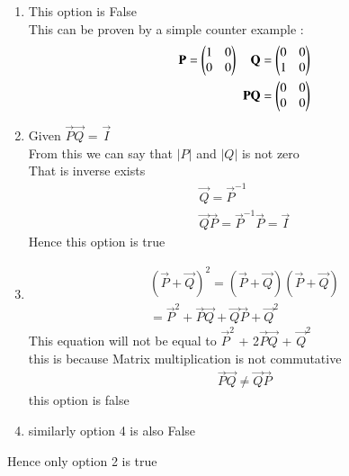 \documentclass[journal]{IEEEtran}
\begin{document}
\begin{enumerate}
    \item This option is False\\
    This can be proven by a simple counter example :\\
    \begin{align}
        \mathbf{P} = \begin{pmatrix}1&0\\0&0\end{pmatrix} \quad
        \mathbf{Q} = \begin{pmatrix}0&0\\1&0\end{pmatrix}\\
        \mathbf{P}\mathbf{Q} = \begin{pmatrix}0&0\\0&0\end{pmatrix}
    \end{align}

    \item Given $\vec{P}\vec{Q}$ = $\vec{I}$ \\
     From this we can say that $\lvert P \rvert$ and $\lvert Q \rvert$ is not zero \\
     That is inverse exists
     \begin{align}
         \vec{Q} = \vec{P}^{-1}\\
         \vec{Q}\vec{P} = \vec{P}^{-1}\vec{P} = \vec{I}
     \end{align}
     Hence this option is true 

     \item \begin{align}
         (\vec{P}+\vec{Q})^2 = (\vec{P}+\vec{Q})(\vec{P}+\vec{Q})\\
          =  \vec{P}^2 + \vec{P}\vec{Q} + \vec{Q}\vec{P} + \vec{Q}^2
     \end{align}
     This equation will not be equal to $\vec{P}^2$ + 2$\vec{P}\vec{Q}$ + $\vec{Q}^2$\\
     this is because Matrix multiplication is not commutative 
     \begin{align}
         \vec{P}\vec{Q} \neq \vec{Q}\vec{P}
     \end{align}
     this option is false 

     \item similarly option 4 is also False 
\end{enumerate}
Hence only option 2 is true
\end{document}

